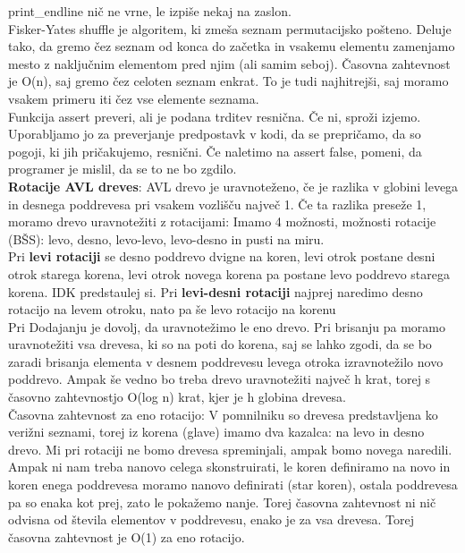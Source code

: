 \documentclass[a4paper]{article}
\begin{document}
\begin{itemize}
        print\_endline nič ne vrne, le izpiše nekaj na zaslon.\\
        Fisker-Yates shuffle je algoritem, ki zmeša seznam permutacijsko pošteno. Deluje tako, da gremo čez seznam od konca do začetka in vsakemu elementu zamenjamo mesto z naključnim elementom pred njim (ali samim seboj). Časovna zahtevnost je O(n), saj gremo čez celoten seznam enkrat. To je tudi najhitrejši, saj moramo vsakem primeru iti čez vse elemente seznama.\\
        Funkcija assert preveri, ali je podana trditev resnična. Če ni, sproži izjemo. Uporabljamo jo za preverjanje predpostavk v kodi, da se prepričamo, da so pogoji, ki jih pričakujemo, resnični. Če naletimo na assert false, pomeni, da programer je mislil, da se to ne bo zgdilo.\\
        \textbf{Rotacije AVL dreves}: AVL drevo je uravnoteženo, če je razlika v globini levega in desnega poddrevesa pri vsakem vozlišču največ 1. Če ta razlika preseže 1, moramo drevo uravnotežiti z rotacijami: Imamo 4 možnosti, možnosti rotacije (BŠS): levo, desno, levo-levo, levo-desno in pusti na miru.\\
        Pri \textbf{levi rotaciji} se desno poddrevo dvigne na koren, levi otrok postane desni otrok starega korena, levi otrok novega korena pa postane levo poddrevo starega korena. IDK predstaulej si. Pri \textbf{levi-desni rotaciji} najprej naredimo desno rotacijo na levem otroku, nato pa še levo rotacijo na korenu\\
        Pri Dodajanju je dovolj, da uravnotežimo le eno drevo. Pri brisanju pa moramo uravnotežiti vsa drevesa, ki so na poti do korena, saj se lahko zgodi, da se bo zaradi brisanja elementa v desnem poddrevesu levega otroka izravnotežilo novo poddrevo. Ampak še vedno bo treba drevo uravnotežiti največ h krat, torej s časovno zahtevnostjo O(log n) krat, kjer je h globina drevesa.\\
        Časovna zahtevnost za eno rotacijo: V pomnilniku so drevesa predstavljena ko verižni seznami, torej iz korena (glave) imamo dva kazalca: na levo in desno drevo. Mi pri rotaciji ne bomo drevesa spreminjali, ampak bomo novega naredili. Ampak ni nam treba nanovo celega skonstruirati, le koren definiramo na novo in koren enega poddrevesa moramo nanovo definirati (star koren), ostala poddrevesa pa so enaka kot prej, zato le pokažemo nanje. Torej časovna zahtevnost ni nič odvisna od števila elementov v poddrevesu, enako je za vsa drevesa. Torej časovna zahtevnost je O(1) za eno rotacijo.\\

\end{itemize}
\end{document}

